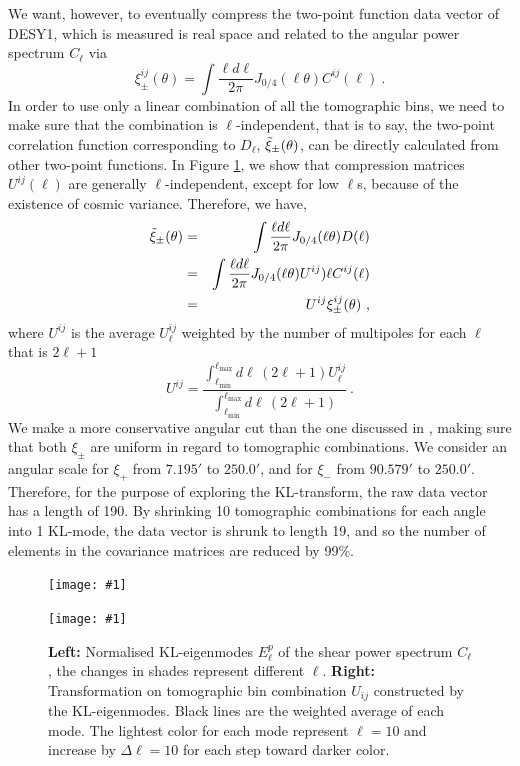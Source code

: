 \documentclass[twocolumn]{\docclass}
\newcommand{\sfig}[2]{
	\texttt{[image: \#1]}
}
\newcommand{\rf}[1]{Figure \ref{fig:#1}}
\newcommand\be{\begin{equation}}
\newcommand\ee{\end{equation}}
\def\bea{\begin{eqnarray}}
\def\eea{\end{eqnarray}}
\begin{document}
	We want, however, to eventually compress the two-point function data vector of DESY1, which is measured is real space and related to the angular power spectrum $C_{\ell}$ via
	\begin{equation*}
	\xi_{\pm}^{ij}(\theta) = \int \frac{\ell d \ell }{2\pi}J_{0/4}(\ell \theta) C^{ij}(\ell)\ 
	.\end{equation*}
	In order to use only a linear combination of all the tomographic bins, we need to make sure that the combination is $\ell$-independent, that is to say, the two-point correlation function corresponding to $D_{\ell}$, $\Tilde{\xi}_{\pm}(\theta)$, can be directly calculated from other two-point functions. In \rf{kl-mode}, we show that compression matrices $U^{ij}(\ell)$ are generally $\ell$-independent, except for low $\ell$s, because of the existence of cosmic variance. Therefore, we have, 
	\bea
	\nonumber\Tilde{\xi}_{\pm}(\theta) &=& \int \frac{\ell d \ell }{2\pi}J_{0/4}(\ell \theta) D(\ell)\\\nonumber
	&=&\int \frac{\ell d \ell }{2\pi}J_{0/4}(\ell \theta) U^{ij})\ell C^{ij}(\ell)\\
	&=&U^{ij}\xi_{\pm}^{ij}(\theta)\
	,\eea
	where $U^{ij}$ is the average $U^{ij}_{\ell}$ weighted by the number of multipoles for each $\ell$ that is $2\ell+1$
	\be
	U^{ij} = \frac{\int_{\ell _{\mathrm{min}}}^{\ell _{\mathrm{max}}} d\ell\, (2 \ell +1) U^{ij}_{\ell}}{\int_{\ell _{\mathrm{min}}}^{\ell _{\mathrm{max}}} d\ell\, (2 \ell +1)}\
	.\ee
	We make a more conservative angular cut than the one discussed in \cite{Troxel:2017xyo}, making sure that both $\xi_{\pm}$ are uniform in regard to tomographic combinations. We consider an angular scale for  $\xi_+$ from $7.195'$ to $250.0'$, and for $\xi_-$ from $90.579'$ to $250.0'$. Therefore, for the purpose of exploring the KL-transform, the raw data vector has a length of 190. By shrinking 10 tomographic combinations for each angle into 1 KL-mode, the data vector is shrunk to length 19, and so the number of elements in the covariance matrices are reduced by 99\%.
	
	\begin{figure}[thbp]
	    \sfig{figures/epi.png}{0.8\columnwidth}
	    \sfig{figures/Wij.png}{1.02\columnwidth}
		\caption{\textbf{Left:} Normalised KL-eigenmodes $E_\ell^p$ of the shear power spectrum $C_{\ell}$, the changes in shades represent different $\ell$. \textbf{Right:} Transformation on tomographic bin combination $U_{ij}$ constructed by the KL-eigenmodes. Black lines are the weighted average of each mode. The lightest color for each mode represent $\ell = 10$ and increase by $\Delta \ell = 10$ for each step toward darker color. \label{fig:kl-mode}}
	\end{figure}
	
\end{document}

